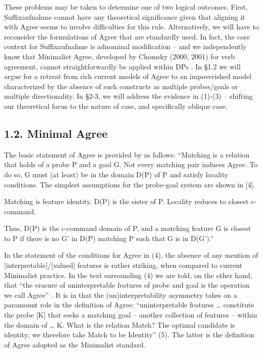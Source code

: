 \documentclass[output=paper]{langsci/langscibook}
\begin{document}
These problems may be taken to determine one of two logical outcomes. First, Suffixaufnahme cannot have any theoretical significance given that aligning it with Agree seems to involve difficulties for this rule. Alternatively, we will have to reconsider the formulations of Agree that are standardly used. In fact, the core context for Suffixaufnahme is adnominal modification – and we independently know that Minimalist Agree, developed by Chomsky (2000, 2001) for verb agreement, cannot straightforwardly be applied within DPs \citep{Carstens2001}. In §1.2 we will argue for a retreat from rich current models of Agree to an impoverished model characterized by the absence of such constructs as multiple probes/goals or multiple directionality. In §2-3, we will address the evidence in (1)-(3) – shifting our theoretical focus to the nature of case, and specifically oblique case.

\subsection{ 1.2. Minimal Agree} 

The basic statement of Agree is provided by \citet[122]{Chomsky2000} as follows: “Matching is a relation that holds of a probe P and a goal G. Not every matching pair induces Agree. To do so, G must (at least) be in the domain D(P) of P and satisfy locality conditions. The simplest assumptions for the probe-goal system are shown in [4].

\ea%
    \label{ex:manzini:4}
    \ea Matching is feature identity.
    \ex D(P) is the sister of P.
    \ex Locality reduces to closest c-command. 
\z
\z

Thus, D(P) is the c-command domain of P, and a matching feature G is closest to P if there is no G' in D(P) matching P such that G is in D(G').” 

In the statement of the conditions for Agree in (4), the absence of any mention of [interpretable]/[valued] features is rather striking, when compared to current Minimalist practice. In the text surrounding (4) we are told, on the other hand, that “the erasure of uninterpretable features of probe and goal is the operation we call Agree” \citep[122]{Chomsky2000}. It is in \citet{Chomsky2001} that the (un)interpretability asymmetry takes on a paramount role in the definition of Agree: “uninterpretable features … constitute the probe [K] that seeks a matching goal – another collection of features – within the domain of … K. What is the relation Match? The optimal candidate is identity; we therefore take Match to be Identity” (5). The latter is the definition of Agree adopted as the Minimalist standard.
\end{document}
